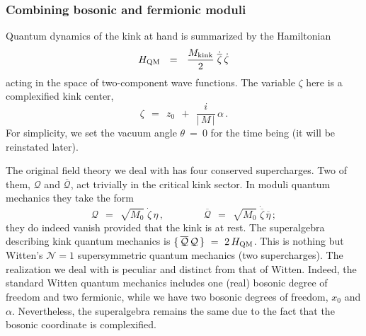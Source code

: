 \documentclass[epsfig,12pt]{article}
\def\beq{\begin{equation}}
\def\eeq{\end{equation}}
\def\beq{\begin{equation}}
\def\eeq{\end{equation}}
\newcommand{\ov}{\overline}
\begin{document}
\subsubsection{Combining bosonic and fermionic moduli}
\label{cbfm}

	Quantum dynamics of the kink at hand is summarized by the
	Hamiltonian
\beq
	H_{\rm QM}  ~~=~~  \frac{M_{\rm kink}}{2}\;\dot{\ov{\zeta}}\, \dot\zeta
\label{13fourtynine}
\eeq
	acting in the space of two-component wave functions.
	The variable $ \zeta $ here is a complexified kink center,
\beq
	\zeta  ~~=~~  z_0  ~~+~~  \frac{i}{|\, M \,|}\, \alpha\,.
\label{13fifty}
\eeq
	For simplicity, we set the vacuum angle $ \theta ~=~0 $ for the time being
	(it will be reinstated later). 

	The original field theory we deal with has four conserved supercharges.
	Two of them, $ {\mathcal Q} $ and $ \ov{\mathcal Q} $, 
	act trivially in the critical kink sector. In moduli quantum
	mechanics they take the form
\beq
	{\mathcal Q}  ~~=~~  \sqrt{ M_0 }\; \dot\zeta\, \eta\,,
	\qquad\qquad
	\ov{\mathcal Q}  ~~=~~  \sqrt{ M_0 }\; \dot{\ov{\zeta}}\, \ov{\eta} \, ;
\label{13fiftyone}
\eeq
	they do indeed vanish provided that the kink is at rest.
	The superalgebra describing kink quantum mechanics is
	$ \{\,  \ov{\mathcal Q}\, {\mathcal Q} \,\} ~=~ 2\, H_{\rm QM} $. 
	This is nothing but Witten's ${\mathcal N} = 1$
	supersymmetric quantum mechanics  (two supercharges).
	The realization we deal with is peculiar and distinct from 
	that of Witten. 
	Indeed, the standard Witten quantum mechanics
	includes one (real) bosonic degree of freedom and two fermionic, while
	we have two bosonic degrees of freedom,
	$ x_0 $ and $ \alpha $. 
	Nevertheless, the superalgebra remains the same
	due to the fact that the bosonic coordinate is complexified.
	 
\end{document}

